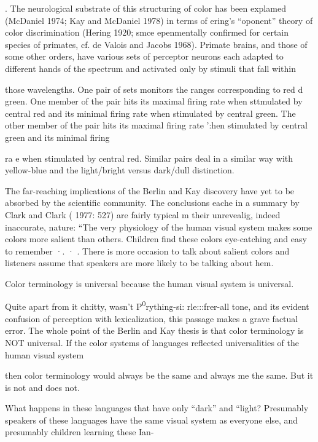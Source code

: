 
. The neurological substrate of this structuring of color has been explamed (McDaniel 1974; Kay and McDaniel 1978) in terms of ering's ``oponent'' theory of color discrimination (Hering 1920; smce epenmentally confirmed for certain species of primates, cf. de Valois and Jacobs 1968). Primate brains, and those of some other orders, have various sets of perceptor neurons each adapted to different hands of the spectrum and activated only by stimuli that fall within

those wavelengths. One pair of sets monitors the ranges corresponding to red d green. One member of the pair hits its maximal firing rate when sttmulated by central red and its minimal firing rate when stimu\-lated by central green. The other member of the pair hits its maximal firing rate ':hen stimulated by central green and its minimal firing

ra e when stimulated by central red. Similar pairs deal in a similar way with yellow-blue and the light/bright versus dark/dull distinction.

The far-reaching implications of the Berlin and Kay discovery have yet to be absorbed by the scientific community. The conclusions eache in a summary by Clark and Clark ( 1977: 527) are fairly typical m their unrevealig, indeed inaccurate, nature: ``The very physiology of the human visual system makes some colors more salient than others. Children find these colors eye-catching and easy to remem\-ber ·. · . There is more occasion to talk about salient colors and listeners assume that speakers are more likely to be talking about hem.

Color terminology is universal because the human visual system is universal.{\textquotedbl}

Quite apart from it ch:itty, wasn't P{\textquotedbl}\textsuperscript{0}rything-si: rle:::frer-all tone, and its evident confusion of perception with lexicalization, this passage makes a grave factual error. The whole point of the Berlin and Kay thesis is that color terminology is NOT universal. If the color systems of languages reflected universalities of the human visual system

then color terminology would always be the same and always me the same. But it is not and does not.

What happens in these languages that have only ``dark'' and ``light{\textquotedbl}? Presumably speakers of these languages have the same visual system as everyone else, and presumably children learning these Ian-

